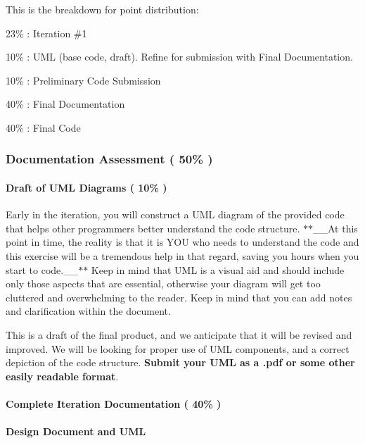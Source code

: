 This is the breakdown for point distribution\+:

23\% \+: Iteration \#1
\begin{DoxyItemize}
\item 10\% \+: U\+ML (base code, draft). Refine for submission with Final Documentation.
\item 10\% \+: Preliminary Code Submission
\item 40\% \+: Final Documentation
\item 40\% \+: Final Code
\end{DoxyItemize}

\subsubsection*{Documentation Assessment ( 50\% )}

\paragraph*{Draft of U\+ML Diagrams ( 10\% )}

Early in the iteration, you will construct a U\+ML diagram of the provided code that helps other programmers better understand the code structure. $\ast$$\ast$\+\_\+\+\_\+\+At this point in time, the reality is that it is Y\+OU who needs to understand the code and this exercise will be a tremendous help in that regard, saving you hours when you start to code.\+\_\+\+\_\+$\ast$$\ast$ Keep in mind that U\+ML is a visual aid and should include only those aspects that are essential, otherwise your diagram will get too cluttered and overwhelming to the reader. Keep in mind that you can add notes and clarification within the document.

This is a draft of the final product, and we anticipate that it will be revised and improved. We will be looking for proper use of U\+ML components, and a correct depiction of the code structure. {\bfseries Submit your U\+ML as a .pdf or some other easily readable format}.

\paragraph*{Complete Iteration Documentation ( 40\% )}

\paragraph*{Design Document and U\+ML}

